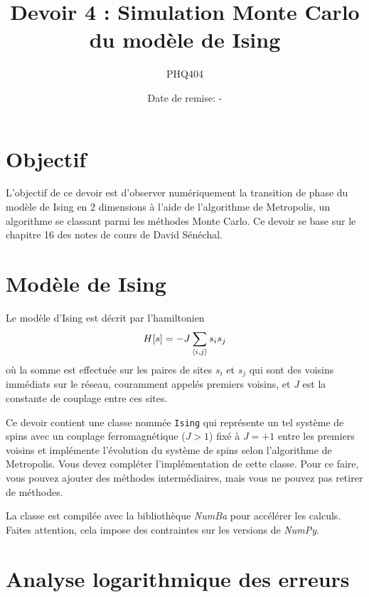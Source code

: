 \documentclass[12pt, letterpaper]{article}
\begin{document}
\title{Devoir 4 : Simulation Monte Carlo du modèle de Ising}
\author{PHQ404}
\date{Date de remise: -}
\maketitle

\section{Objectif}\label{sec:objectif}

\noindent L'objectif de ce devoir est d'observer numériquement la transition de phase
du modèle de Ising en 2 dimensions à l'aide de l'algorithme de Metropolis, un algorithme se classant parmi les méthodes Monte Carlo.
Ce devoir se base sur le chapitre 16 des notes de cours de David Sénéchal.


\section{Modèle de Ising}\label{sec:modele-de-ising}

\noindent Le modèle d'Ising est décrit par l'hamiltonien
\begin{equation}
	H[s] = -J \sum_{\braket{i,j}} s_{i} s_{j}
\end{equation}
où la somme est effectuée sur les paires de sites $s_{i}$ et $s_{j}$ qui sont des voisins immédiats sur le réseau, couramment appelés premiers voisins, et $J$ est la constante de couplage entre ces sites.

\bigskip

\noindent Ce devoir contient une classe nommée \texttt{Ising} qui représente
un tel système de spins avec un couplage ferromagnétique ($J >1$) fixé à $J = +1$ entre les premiers voisins et implémente l'évolution du système de spins selon l'algorithme de Metropolis.
Vous devez compléter l'implémentation de cette classe.
Pour ce faire, vous pouvez ajouter des méthodes intermédiaires,
mais vous ne pouvez pas retirer de méthodes.

\bigskip

\noindent La classe est compilée avec la bibliothèque \textit{NumBa} pour accélérer les calculs.
Faites attention, cela impose des contraintes sur les versions de \textit{NumPy}.

\section{Analyse logarithmique des erreurs}\label{sec:methode-du-binning}
\end{document}
